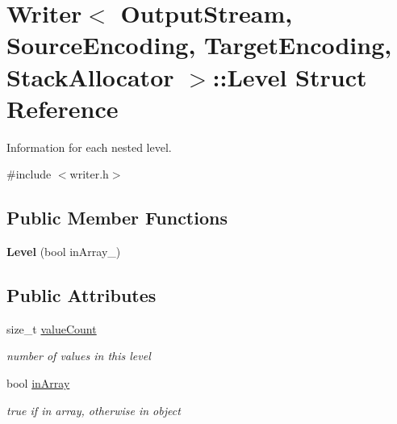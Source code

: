 \hypertarget{struct_writer_1_1_level}{}\section{Writer$<$ Output\+Stream, Source\+Encoding, Target\+Encoding, Stack\+Allocator $>$\+:\+:Level Struct Reference}
\label{struct_writer_1_1_level}


Information for each nested level.  




{\ttfamily \#include $<$writer.\+h$>$}

\subsection*{Public Member Functions}
\begin{DoxyCompactItemize}
\item 
{\bfseries Level} (bool in\+Array\+\_\+)\hypertarget{struct_writer_1_1_level_a4c9d2a6336d707725cd749b80059e59d}{}\label{struct_writer_1_1_level_a4c9d2a6336d707725cd749b80059e59d}

\end{DoxyCompactItemize}
\subsection*{Public Attributes}
\begin{DoxyCompactItemize}
\item 
size\+\_\+t \hyperlink{struct_writer_1_1_level_a01214721e4001d997f3057d26edba9a0}{value\+Count}\hypertarget{struct_writer_1_1_level_a01214721e4001d997f3057d26edba9a0}{}\label{struct_writer_1_1_level_a01214721e4001d997f3057d26edba9a0}

\begin{DoxyCompactList}\small\item\em number of values in this level \end{DoxyCompactList}\item 
bool \hyperlink{struct_writer_1_1_level_aa188a24842bcadebcd037ab852b978bb}{in\+Array}\hypertarget{struct_writer_1_1_level_aa188a24842bcadebcd037ab852b978bb}{}\label{struct_writer_1_1_level_aa188a24842bcadebcd037ab852b978bb}

\begin{DoxyCompactList}\small\item\em true if in array, otherwise in object \end{DoxyCompactList}\end{DoxyCompactItemize}


